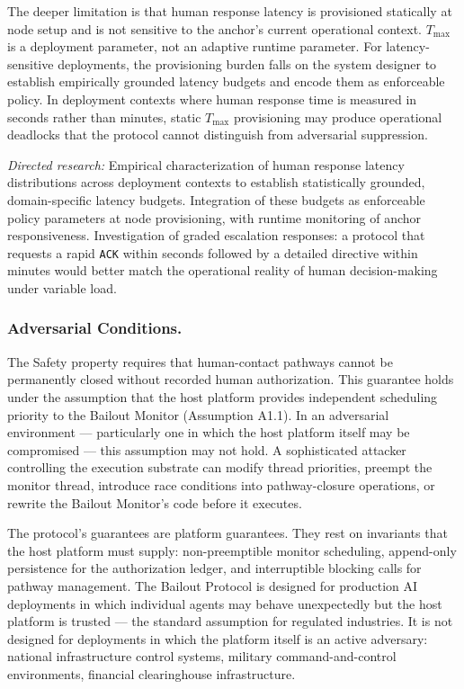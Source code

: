 The deeper limitation is that human response latency is provisioned statically at node setup and is not sensitive to the anchor's current operational context. $T_{\max}$ is a deployment parameter, not an adaptive runtime parameter. For latency-sensitive deployments, the provisioning burden falls on the system designer to establish empirically grounded latency budgets and encode them as enforceable policy. In deployment contexts where human response time is measured in seconds rather than minutes, static $T_{\max}$ provisioning may produce operational deadlocks that the protocol cannot distinguish from adversarial suppression.

\textit{Directed research:} Empirical characterization of human response latency distributions across deployment contexts to establish statistically grounded, domain-specific latency budgets. Integration of these budgets as enforceable policy parameters at node provisioning, with runtime monitoring of anchor responsiveness. Investigation of graded escalation responses: a protocol that requests a rapid \texttt{ACK} within seconds followed by a detailed directive within minutes would better match the operational reality of human decision-making under variable load.

\subsubsection{Adversarial Conditions.}
The Safety property requires that human-contact pathways cannot be permanently closed without recorded human authorization. This guarantee holds under the assumption that the host platform provides independent scheduling priority to the Bailout Monitor (Assumption A1.1). In an adversarial environment — particularly one in which the host platform itself may be compromised — this assumption may not hold. A sophisticated attacker controlling the execution substrate can modify thread priorities, preempt the monitor thread, introduce race conditions into pathway-closure operations, or rewrite the Bailout Monitor's code before it executes.

The protocol's guarantees are platform guarantees. They rest on invariants that the host platform must supply: non-preemptible monitor scheduling, append-only persistence for the authorization ledger, and interruptible blocking calls for pathway management. The Bailout Protocol is designed for production AI deployments in which individual agents may behave unexpectedly but the host platform is trusted — the standard assumption for regulated industries. It is not designed for deployments in which the platform itself is an active adversary: national infrastructure control systems, military command-and-control environments, financial clearinghouse infrastructure.

